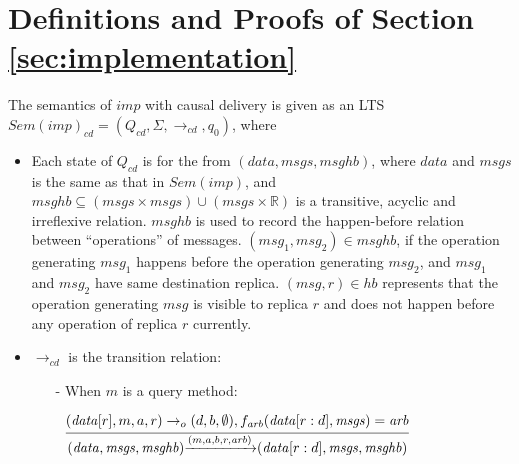 









\section{Definitions and Proofs of Section \ref{sec:implementation}}
\label{sec:appendix definitions and proofs of section implementation}

The semantics of $\mathit{imp}$ with causal delivery is given as an LTS $\mathit{Sem}(\mathit{imp})_{\mathit{cd}} = (Q_{\mathit{cd}},\Sigma,\rightarrow_{\mathit{cd}},q_0)$, where

\begin {itemize}
\setlength{\itemsep}{0.5pt}
\item[-] Each state of $Q_{\mathit{cd}}$ is for the from $(\mathit{data},\mathit{msgs},\mathit{msghb})$, where $\mathit{data}$ and $\mathit{msgs}$ is the same as that in $\mathit{Sem}(\mathit{imp})$, and $\mathit{msghb} \subseteq (\mathit{msgs} \times \mathit{msgs}) \cup (\mathit{msgs} \times \mathbb{R})$ is a transitive, acyclic and irreflexive relation. $\mathit{msghb}$ is used to record the happen-before relation between ``operations'' of messages. %
    $(\mathit{msg}_1,\mathit{msg}_2) \in \mathit{msghb}$, if the operation generating $\mathit{msg}_1$ happens before the operation generating $\mathit{msg}_2$, and $\mathit{msg}_1$ and $\mathit{msg}_2$ have same destination replica. $(\mathit{msg},r) \in \mathit{hb}$ represents that the operation generating $\mathit{msg}$ is visible to replica $r$ and does not happen before any operation of replica $r$ currently.

\item[-] $\rightarrow_{\mathit{cd}}$ is the transition relation:

    \begin{itemize}
    \setlength{\itemsep}{0.5pt}
    \item[-] When $m$ is a query method:

    $\begin{array}{l c} \bigfrac{ (\mathit{data}[r],m,a,r) \rightarrow_o (d,b,\emptyset),f_{\mathit{arb}}(\mathit{data}[r:d],\mathit{msgs}) = \mathit{arb}} {(\mathit{data},\mathit{msgs},\mathit{msghb}) {\xrightarrow{(m,a,b,r,\mathit{arb})}} (\mathit{data}[r:d],\mathit{msgs},\mathit{msghb})} \end{array}$


\end{itemize}
\end{itemize}
